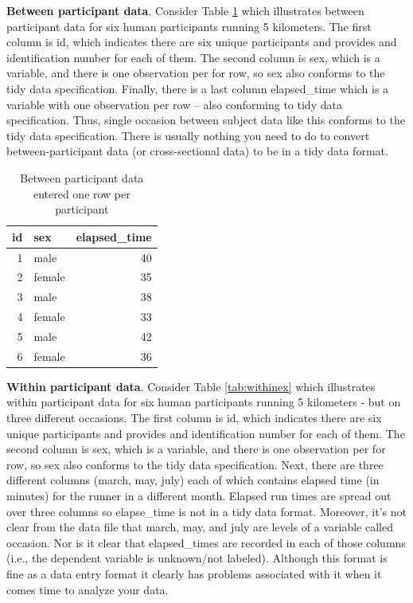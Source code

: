\documentclass[
]{krantz}
\begin{document}
\textbf{Between participant data}. Consider Table \ref{tab:betweenex} which illustrates between participant data for six human participants running 5 kilometers. The first column is id, which indicates there are six unique participants and provides and identification number for each of them. The second column is sex, which is a variable, and there is one observation per for row, so sex also conforms to the tidy data specification. Finally, there is a last column elapsed\_time which is a variable with one observation per row -- also conforming to tidy data specification. Thus, single occasion between subject data like this conforms to the tidy data specification. There is usually nothing you need to do to convert between-participant data (or cross-sectional data) to be in a tidy data format.

\begin{table}

\caption{\label{tab:betweenex}Between participant data entered one row per participant}
\centering
\begin{tabular}[t]{rlr}
\toprule
id & sex & elapsed\_time\\
\midrule
1 & male & 40\\
2 & female & 35\\
3 & male & 38\\
4 & female & 33\\
5 & male & 42\\
6 & female & 36\\
\bottomrule
\end{tabular}
\end{table}

\textbf{Within participant data}. Consider Table \ref{tab:withinex} which illustrates within participant data for six human participants running 5 kilometers - but on three different occasions. The first column is id, which indicates there are six unique participants and provides and identification number for each of them. The second column is sex, which is a variable, and there is one observation per for row, so sex also conforms to the tidy data specification. Next, there are three different columns (march, may, july) each of which contains elapsed time (in minutes) for the runner in a different month. Elapsed run times are spread out over three columns so elapse\_time is not in a tidy data format. Moreover, it's not clear from the data file that march, may, and july are levels of a variable called occasion. Nor is it clear that elapsed\_times are recorded in each of those columns (i.e., the dependent variable is unknown/not labeled). Although this format is fine as a data entry format it clearly has problems associated with it when it comes time to analyze your data.
\end{document}
